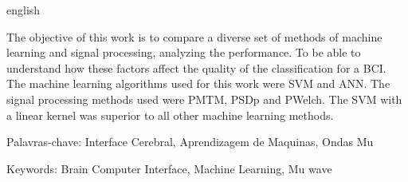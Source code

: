 \begin{resumo}[ABSTRACT]
\begin{otherlanguage*}{english}

The objective of this work is to compare a diverse set of methods of machine learning and signal processing, analyzing the performance. To be able to understand how these factors affect the quality of the classification for a \acs{BCI}.
 The machine learning algorithms used for this work were \ac{SVM} and  \ac{ANN}. The signal processing methods used were \ac{PMTM}, \ac{PSDp} and \ac{PWelch}. The \ac{SVM} with a linear kernel was superior to all other machine learning methods.
 


Palavras-chave: Interface Cerebral, Aprendizagem de Maquinas, Ondas Mu %

Keywords: Brain Computer Interface, Machine Learning, Mu wave 
 \end{otherlanguage*}
\end{resumo}
